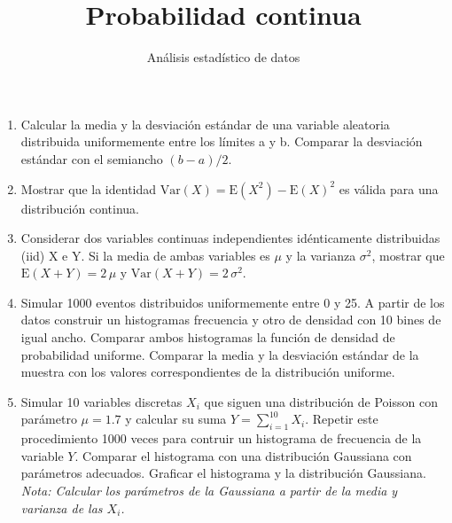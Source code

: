 \documentclass[a4paper,11pt]{article}
\title{Probabilidad continua}
\author{Análisis estadístico de datos}
\begin{document}
\maketitle

\begin{enumerate}

\item Calcular la media y la desviación estándar de una variable aleatoria distribuida uniformemente entre los límites a y b. Comparar la desviación estándar con el semiancho $(b-a)/2$.

\item Mostrar que la identidad  $\mathrm{Var}(X) = \mathrm{E}(X^2) - \mathrm{E}(X)^2$ es válida para una distribución continua.

\item Considerar dos variables continuas independientes idénticamente distribuidas (iid) X e Y. Si la media de ambas variables es $\mu$ y la varianza $\sigma^2$, mostrar que $\mathrm{E}(X+Y) = 2 \, \mu$ y $\mathrm{Var}(X+Y) = 2 \, \sigma^2$.  

\item Simular 1000 eventos distribuidos uniformemente entre 0 y 25. A partir de los datos construir un histogramas frecuencia y otro de densidad con 10 bines de igual ancho. Comparar ambos histogramas la función de densidad de probabilidad uniforme. Comparar la media y la desviación estándar de la muestra con los valores correspondientes de la distribución uniforme. 


\item  Simular 10 variables discretas $X_i$ que siguen una distribución de Poisson con parámetro $\mu=1.7$ y calcular su suma $Y = \sum_{i=1}^{10} X_i$. Repetir este procedimiento 1000 veces para contruir un histograma de frecuencia de la variable $Y$. Comparar el histograma con una distribución Gaussiana con parámetros adecuados. Graficar el histograma y la distribución Gaussiana. \emph{Nota: Calcular los parámetros de la Gaussiana a partir de la media y varianza de las $X_i$. }


\end{enumerate}
\end{document}
